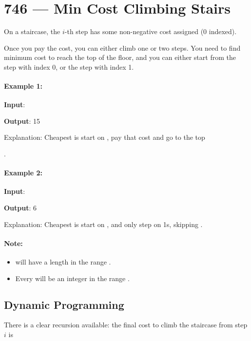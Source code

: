 \section{746 --- Min Cost Climbing Stairs}
On a staircase, the $i$-th step has some non-negative cost  assigned (0 indexed).

Once you pay the cost, you can either climb one or two steps. You need to find minimum cost to reach the top of the floor, and you can either start from the step with index 0, or the step with index 1.

\paragraph{Example 1:}

\begin{flushleft}
\textbf{Input}: 

\textbf{Output}: 15

Explanation: Cheapest is start on , pay that cost and go to the top
\end{flushleft}.

\paragraph{Example 2:}

\begin{flushleft}
\textbf{Input}: 

\textbf{Output}: 6

Explanation: Cheapest is start on , and only step on 1s, skipping .

\end{flushleft}

\paragraph{Note:}

\begin{itemize}
\item {} will have a length in the range \fcj{[2, 1000]}.
\item Every  will be an integer in the range \fcj{[0, 999]}.

\end{itemize}

\subsection{Dynamic Programming}
There is a clear recursion available: the final cost  to climb the staircase from step $i$ is 

